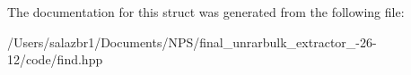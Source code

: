 The documentation for this struct was generated from the following file\-:\begin{DoxyCompactItemize}
\item 
/\-Users/salazbr1/\-Documents/\-N\-P\-S/final\-\_\-unrarbulk\-\_\-extractor\-\_-\/26-\/12/code/find.\-hpp\end{DoxyCompactItemize}

